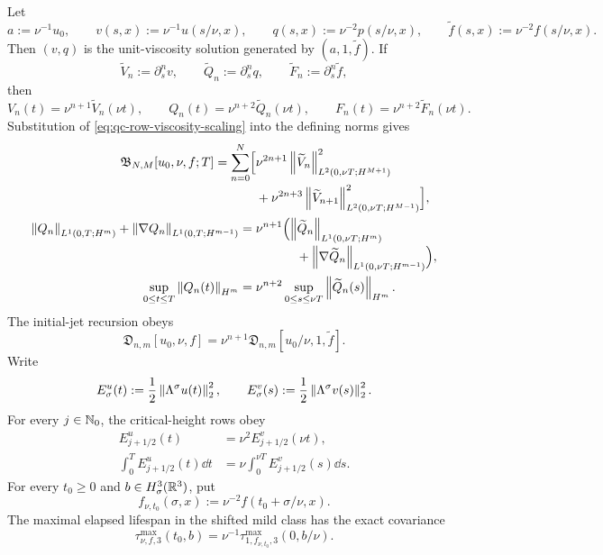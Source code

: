 \begin{proposition}
\label{prop:qc-exact-viscosity-scaling}
Let
\[
 a:=\nu^{-1}u_0,
 \qquad
 v(s,x):=\nu^{-1}u(s/\nu,x),
 \qquad
 q(s,x):=\nu^{-2}p(s/\nu,x),
 \qquad
 \widetilde f(s,x):=\nu^{-2}f(s/\nu,x).
\]
Then \((v,q)\) is the unit-viscosity solution generated by
\((a,1,\widetilde f)\).  If
\[
 \widetilde V_n:=\partial_s^nv,
 \qquad
 \widetilde Q_n:=\partial_s^nq,
 \qquad
 \widetilde F_n:=\partial_s^n\widetilde f,
\]
then
\begin{equation}
 V_n(t)=\nu^{n+1}\widetilde V_n(\nu t),
 \qquad
 Q_n(t)=\nu^{n+2}\widetilde Q_n(\nu t),
 \qquad
 F_n(t)=\nu^{n+2}\widetilde F_n(\nu t).
 \label{eq:qc-row-viscosity-scaling}
\end{equation}
Substitution of \eqref{eq:qc-row-viscosity-scaling} into the defining norms gives
\begin{align}
 \mathfrak B_{N,M}[u_0,\nu,f;T]
 =\sum_{n=0}^{N}\Bigl[{}
 &\nu^{2n+1}
 \left\lVert \widetilde V_n\right\rVert_{L^2(0,\nu T;H^{M+1})}^2
 \notag\\[-2pt]
 &+\nu^{2n+3}
 \left\lVert \widetilde V_{n+1}\right\rVert_{L^2(0,\nu T;H^{M-1})}^2
 \Bigr],
 \label{eq:qc-rectangle-viscosity-scaling}\\
 \left\lVert Q_n\right\rVert_{L^1(0,T;H^m)}
 +\left\lVert \nabla Q_n\right\rVert_{L^1(0,T;H^{m-1})}
 ={}&\nu^{n+1}\Bigl(
 \left\lVert \widetilde Q_n\right\rVert_{L^1(0,\nu T;H^m)}
 \notag\\[-2pt]
 &\hspace{32pt}+
 \left\lVert \nabla\widetilde Q_n\right\rVert_{L^1(0,\nu T;H^{m-1})}
 \Bigr),
 \label{eq:qc-pressure-viscosity-scaling}\\
 \sup_{0\le t\le T}\left\lVert Q_n(t)\right\rVert_{H^m}
 ={}&\nu^{n+2}
 \sup_{0\le s\le\nu T}\left\lVert \widetilde Q_n(s)\right\rVert_{H^m}.
 \label{eq:qc-pressure-sup-viscosity-scaling}
\end{align}
The initial-jet recursion obeys
\begin{equation}
 \mathfrak D_{n,m}[u_0,\nu,f]
 =\nu^{n+1}\mathfrak D_{n,m}[u_0/\nu,1,\widetilde f].
 \label{eq:qc-initial-jet-viscosity-scaling}
\end{equation}
Write
\[
 E_\sigma^u(t):=\frac12\left\lVert \Lambda^\sigma u(t)\right\rVert_2^2,
 \qquad
 E_\sigma^v(s):=\frac12\left\lVert \Lambda^\sigma v(s)\right\rVert_2^2.
\]
For every \(j\in\mathbb N_0\), the critical-height rows obey
\begin{align}
 E_{j+1/2}^u(t)
 &=\nu^2E_{j+1/2}^v(\nu t),
 \label{eq:qc-critical-height-viscosity-scaling}\\
 \int_0^T E_{j+1/2}^u(t)\dd t
 &=\nu\int_0^{\nu T}E_{j+1/2}^v(s)\dd s.
 \label{eq:qc-critical-height-mass-viscosity-scaling}
\end{align}
For every \(t_0\ge0\) and \(b\in H^3_\sigma(\mathbb R^3)\), put
\[
 f_{\nu,t_0}(\sigma,x):=\nu^{-2}f(t_0+\sigma/\nu,x).
\]
The maximal elapsed lifespan in the shifted mild class has the exact
covariance
\begin{equation}
 \tau_{\nu,f,3}^{\max}(t_0,b)
 =\nu^{-1}\tau_{1,f_{\nu,t_0},3}^{\max}(0,b/\nu).
 \label{eq:qc-maximal-lifespan-viscosity-scaling}
\end{equation}
\end{proposition}

